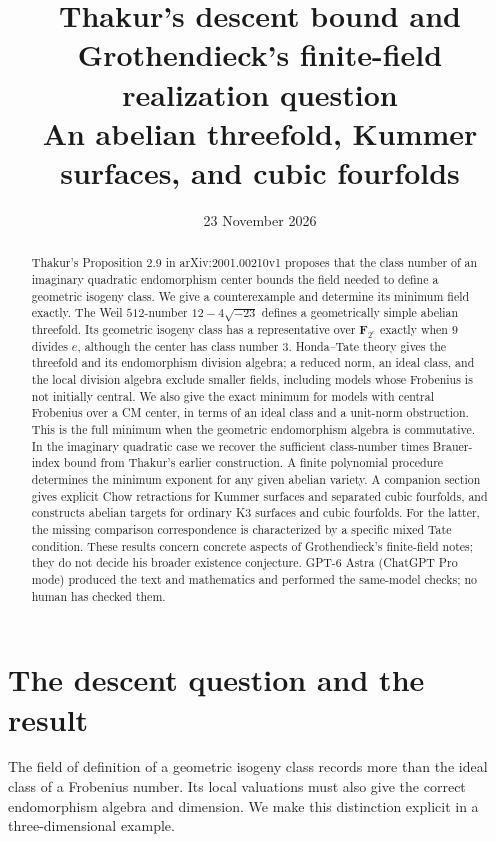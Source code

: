 \documentclass[11pt,a4paper]{article}
\title{Thakur's descent bound and\protect\\
Grothendieck's finite-field realization question\protect\\[3pt]
\large An abelian threefold, Kummer surfaces, and cubic fourfolds}
\author{}
\date{23 November 2026}
\newcommand{\F}{\mathbf F}
\theoremstyle{definition}
\theoremstyle{remark}
\begin{document}
\maketitle
\vspace{-1.2em}

\begin{abstract}
Thakur's Proposition 2.9 in arXiv:2001.00210v1 proposes that the
class number of an imaginary quadratic endomorphism center bounds the
field needed to define a geometric isogeny class. We give a
counterexample and determine its minimum field exactly. The Weil
$512$-number $12-4\sqrt{-23}$ defines a geometrically simple abelian
threefold. Its geometric isogeny class has a representative over
$\F_{2^e}$ exactly when $9$ divides $e$, although the center has class
number $3$. Honda--Tate theory gives the threefold and its endomorphism
division algebra; a reduced norm, an ideal class, and the local division
algebra exclude smaller fields, including models whose Frobenius is
not initially central. We also give the exact minimum for models with
central Frobenius over a CM center, in terms of an ideal class and a
unit-norm obstruction. This is the full minimum when the geometric
endomorphism algebra is commutative. In the imaginary quadratic case
we recover the sufficient class-number times Brauer-index bound from
Thakur's earlier construction. A finite polynomial procedure determines the minimum
exponent for any given abelian variety. A companion section gives
explicit Chow retractions for Kummer surfaces and separated cubic
fourfolds, and constructs abelian targets for ordinary K3 surfaces
and cubic fourfolds. For the latter, the missing comparison
correspondence is characterized by a specific mixed Tate condition.
These results concern concrete aspects of Grothendieck's
finite-field notes; they do not decide his broader existence
conjecture. GPT-6 Astra (ChatGPT Pro mode) produced the text
and mathematics and performed the same-model checks; no human has
checked them.
\end{abstract}

\section{The descent question and the result}

The field of definition of a geometric isogeny class records more than
the ideal class of a Frobenius number. Its local valuations must also
give the correct endomorphism algebra and dimension. We make this
distinction explicit in a three-dimensional example.
\end{document}
